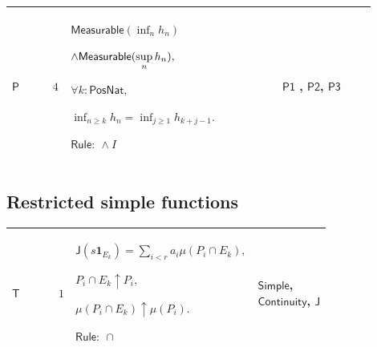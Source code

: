 \documentclass[12pt,reqno]{amsart}
\theoremstyle{blueplain}
\numberwithin{equation}{section}
\newlength{\FATOUOneColumnBody}
\begin{document}
{\scriptsize \setlength{\parskip}{0pt}\nointerlineskip
\noindent 
\begin{tabular}{|@{}>{\centering\arraybackslash}m{0.10658\linewidth}|>{\centering\arraybackslash}m{0.03553\linewidth}|>{\centering\arraybackslash}m{0.52105\linewidth}|>{\centering\arraybackslash}m{0.23684\linewidth}|}
\hline
\hypertarget{proof:P4}{$\displaystyle \mathsf{P}$} & $\displaystyle 4$ & $%
\displaystyle \mathsf{Measurable}(\inf_nh_n)$\par$\displaystyle \land\mathsf{%
Measurable}(\sup_nh_n),$\par$\displaystyle \forall k:\mathsf{PosNat},$\par$%
\displaystyle \inf_{n\ge k}h_n=\inf_{j\ge1}h_{k+j-1}.$\par$\displaystyle 
\mathsf{Rule}:\ \land I$ & \hyperlink{proof:P1}{$\displaystyle \mathsf{P1}$}%
, \hyperlink{proof:P2}{$\displaystyle \mathsf{P2}$}, \hyperlink{proof:P3}{$%
\displaystyle \mathsf{P3}$} \\ \hline
\end{tabular}%
}

\subsection{\protect\scriptsize Restricted simple functions}

{\scriptsize \setlength{\parskip}{0pt}\nointerlineskip
\noindent 
\begin{tabular}{|@{}>{\centering\arraybackslash}m{\FATOUOneColumnBody}|}
\hline
$\displaystyle \mathsf{Context\_T}:=$\par$\displaystyle s:\mathsf{S}_A,\quad%
\mathsf{Rep}(s;r,a,P),$\par$\displaystyle (\forall k,\ E_k\in A)\land
E_k\uparrow X.$ \\ \hline
\end{tabular}%
}

{\scriptsize \setlength{\parskip}{0pt}\nointerlineskip
\noindent 
\begin{tabular}{|@{}>{\centering\arraybackslash}m{0.10658\linewidth}|>{\centering\arraybackslash}m{0.03553\linewidth}|>{\centering\arraybackslash}m{0.52105\linewidth}|>{\centering\arraybackslash}m{0.23684\linewidth}|}
\hline
\hypertarget{proof:T1}{$\displaystyle \mathsf{T}$} & $\displaystyle 1$ & $%
\displaystyle \mathsf{J}(s\mathbf{1}_{E_k})=\sum_{i<r}a_i\mu(P_i\cap E_k),$%
\par$\displaystyle P_i\cap E_k\uparrow P_i,$\par$\displaystyle \mu(P_i\cap
E_k)\uparrow\mu(P_i).$\par$\displaystyle \mathsf{Rule}:\ \cap$ & \hyperlink{lem:Simple}%
{$\displaystyle \mathsf{Simple}$}, \hyperlink{lem:Continuity}{$\displaystyle 
\mathsf{Continuity}$}, \hyperlink{def:J}{$\displaystyle \mathsf{J}$} \\ 
\hline
\end{tabular}%
}
\end{document}
